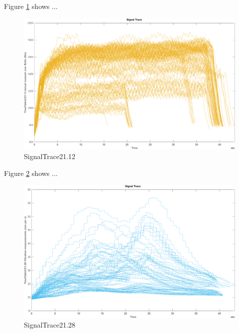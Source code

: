 \documentclass{article}
\begin{document}
Figure \ref{fig:SignalTrace21.12} shows ...
\begin{figure}[!ht]
    \centering
    \includegraphics[width=\textwidth, height=\textheight, keepaspectratio]{figures/SignalTrace21.12.png}
    \caption{SignalTrace21.12}
    \label{fig:SignalTrace21.12}
\end{figure}

Figure \ref{fig:SignalTrace21.28} shows ...
\begin{figure}[!ht]
    \centering
    \includegraphics[width=\textwidth, height=\textheight, keepaspectratio]{figures/SignalTrace21.28.png}
    \caption{SignalTrace21.28}
    \label{fig:SignalTrace21.28}
\end{figure}
\end{document}
